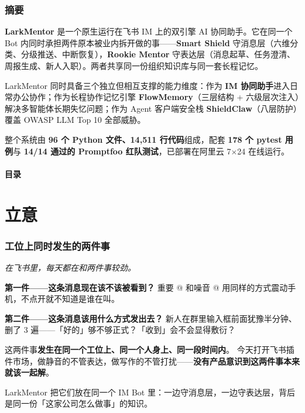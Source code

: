 \documentclass[11pt,a4paper]{ctexart}
\begin{document}
\vfill
\newpage

\thispagestyle{fancy}
\section*{摘要}

\begin{infobox}
\textbf{LarkMentor} 是一个原生运行在飞书 IM 上的双引擎 AI 协同助手。它在同一个 Bot 内同时承担两件原本被业内拆开做的事——\textbf{Smart Shield} 守消息层（六维分类、分级推送、中断恢复），\textbf{Rookie Mentor} 守表达层（消息起草、任务澄清、周报生成、新人入职）。两者共享同一份组织知识库与同一套长程记忆。

LarkMentor 同时具备三个独立但相互支撑的能力维度：作为 \textbf{IM 协同助手}进入日常办公协作；作为长程协作记忆引擎 \textbf{FlowMemory}（三层结构 + 六级层次注入）解决多智能体长期失忆问题；作为 Agent 客户端安全栈 \textbf{ShieldClaw}（八层防护）覆盖 OWASP LLM Top 10 全部威胁。

整个系统由 \textbf{96 个 Python 文件、14{,}511 行代码}组成，配套 \textbf{178 个 pytest 用例}与 \textbf{14/14 通过的 Promptfoo 红队测试}，已部署在阿里云 7$\times$24 在线运行。
\end{infobox}

\subsection*{目录}
\vspace{-0.6em}
\begingroup
\hypersetup{linkcolor=primary}
\renewcommand{\contentsname}{}
\tableofcontents
\endgroup

\newpage

\part{立意}

\section{工位上同时发生的两件事}

\begin{quotebox}
\large\itshape
在飞书里，每天都在和两件事较劲。

\textbf{第一件——这条消息现在该不该被看到？}
重要 @ 和噪音 @ 用同样的方式震动手机，不点开就不知道是谁在叫。

\textbf{第二件——这条消息该用什么方式发出去？}
新人在群里输入框前面犹豫半分钟、删了 3 遍——「好的」够不够正式？「收到」会不会显得敷衍？

这两件事\textbf{发生在同一个工位上、同一个人身上、同一段时间内}。
今天打开飞书插件市场，做静音的不管表达，做写作的不管打扰——\textbf{没有产品意识到这两件事本来就该一起解}。

LarkMentor 把它们放在同一个 IM Bot 里：一边守消息层，一边守表达层，背后是同一份「这家公司怎么做事」的知识。
\end{quotebox}
\end{document}
